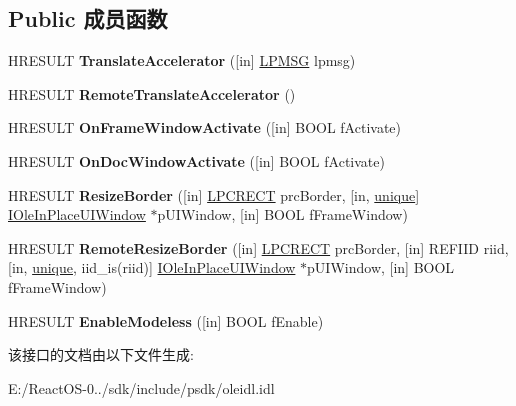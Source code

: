 \subsection*{Public 成员函数}
\begin{DoxyCompactItemize}
\item 
\mbox{\label{interface_i_ole_in_place_active_object_a237a67078e419f1afff9c4de4d811c51}} 
H\+R\+E\+S\+U\+LT {\bfseries Translate\+Accelerator} (\mbox{[}in\mbox{]} \hyperlink{structtag_m_s_g}{L\+P\+M\+SG} lpmsg)
\item 
\mbox{\label{interface_i_ole_in_place_active_object_a20841bd50a0d2e6a24e360476bb258b3}} 
H\+R\+E\+S\+U\+LT {\bfseries Remote\+Translate\+Accelerator} ()
\item 
\mbox{\label{interface_i_ole_in_place_active_object_af6517e163931966bbba182d596615652}} 
H\+R\+E\+S\+U\+LT {\bfseries On\+Frame\+Window\+Activate} (\mbox{[}in\mbox{]} B\+O\+OL f\+Activate)
\item 
\mbox{\label{interface_i_ole_in_place_active_object_a49c5e05fb430e8e0390c2c68e1bee49a}} 
H\+R\+E\+S\+U\+LT {\bfseries On\+Doc\+Window\+Activate} (\mbox{[}in\mbox{]} B\+O\+OL f\+Activate)
\item 
\mbox{\label{interface_i_ole_in_place_active_object_a1f9ccd56e9d29da3fe6b34e9bd164d51}} 
H\+R\+E\+S\+U\+LT {\bfseries Resize\+Border} (\mbox{[}in\mbox{]} \hyperlink{structtag_r_e_c_t}{L\+P\+C\+R\+E\+CT} prc\+Border, \mbox{[}in, \hyperlink{interfaceunique}{unique}\mbox{]} \hyperlink{interface_i_ole_in_place_u_i_window}{I\+Ole\+In\+Place\+U\+I\+Window} $\ast$p\+U\+I\+Window, \mbox{[}in\mbox{]} B\+O\+OL f\+Frame\+Window)
\item 
\mbox{\label{interface_i_ole_in_place_active_object_a82eb7c2cb4f462c32c1296b89c7ce2ee}} 
H\+R\+E\+S\+U\+LT {\bfseries Remote\+Resize\+Border} (\mbox{[}in\mbox{]} \hyperlink{structtag_r_e_c_t}{L\+P\+C\+R\+E\+CT} prc\+Border, \mbox{[}in\mbox{]} R\+E\+F\+I\+ID riid, \mbox{[}in, \hyperlink{interfaceunique}{unique}, iid\+\_\+is(riid)\mbox{]} \hyperlink{interface_i_ole_in_place_u_i_window}{I\+Ole\+In\+Place\+U\+I\+Window} $\ast$p\+U\+I\+Window, \mbox{[}in\mbox{]} B\+O\+OL f\+Frame\+Window)
\item 
\mbox{\label{interface_i_ole_in_place_active_object_a6ca5ad78242cbc542d94e464ba9c3ab4}} 
H\+R\+E\+S\+U\+LT {\bfseries Enable\+Modeless} (\mbox{[}in\mbox{]} B\+O\+OL f\+Enable)
\end{DoxyCompactItemize}


该接口的文档由以下文件生成\+:\begin{DoxyCompactItemize}
\item 
E\+:/\+React\+O\+S-\/0../sdk/include/psdk/oleidl.\+idl\end{DoxyCompactItemize}
